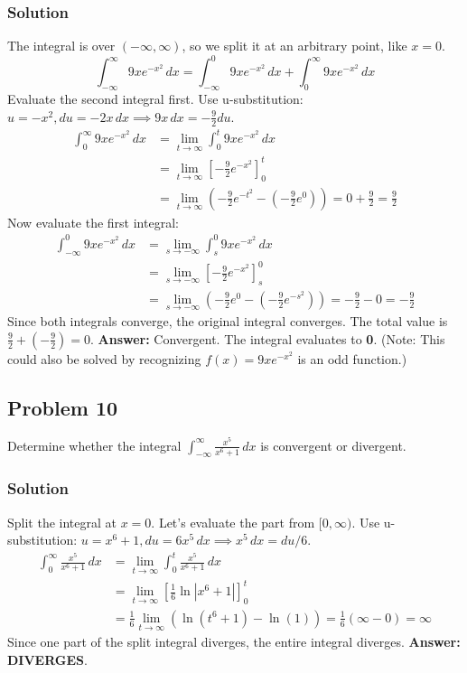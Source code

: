 \documentclass{article}
\begin{document}
\subsubsection*{Solution}
The integral is over $ (-\infty, \infty) $, so we split it at an arbitrary point, like $ x=0 $.
\[ \int_{-\infty}^{\infty} 9xe^{-x^2} \,dx = \int_{-\infty}^{0} 9xe^{-x^2} \,dx + \int_{0}^{\infty} 9xe^{-x^2} \,dx \]
Evaluate the second integral first. Use u-substitution: $ u = -x^2, du = -2x \,dx \implies 9x\,dx = -\frac{9}{2}du $.
\begin{align*}
    \int_{0}^{\infty} 9xe^{-x^2} \,dx &= \lim_{t \to \infty} \int_{0}^{t} 9xe^{-x^2} \,dx \\
    &= \lim_{t \to \infty} \left[ -\frac{9}{2}e^{-x^2} \right]_{0}^{t} \\
    &= \lim_{t \to \infty} \left( -\frac{9}{2}e^{-t^2} - \left(-\frac{9}{2}e^0\right) \right) = 0 + \frac{9}{2} = \frac{9}{2}
\end{align*}
Now evaluate the first integral:
\begin{align*}
    \int_{-\infty}^{0} 9xe^{-x^2} \,dx &= \lim_{s \to -\infty} \int_{s}^{0} 9xe^{-x^2} \,dx \\
    &= \lim_{s \to -\infty} \left[ -\frac{9}{2}e^{-x^2} \right]_{s}^{0} \\
    &= \lim_{s \to -\infty} \left( -\frac{9}{2}e^{0} - \left(-\frac{9}{2}e^{-s^2}\right) \right) = -\frac{9}{2} - 0 = -\frac{9}{2}
\end{align*}
Since both integrals converge, the original integral converges. The total value is $ \frac{9}{2} + (-\frac{9}{2}) = 0 $.
\textbf{Answer:} Convergent. The integral evaluates to \textbf{0}.
(Note: This could also be solved by recognizing $f(x)=9xe^{-x^2}$ is an odd function.)

\subsection{Problem 10}
Determine whether the integral $ \int_{-\infty}^{\infty} \frac{x^5}{x^6+1} \,dx $ is convergent or divergent.
\subsubsection*{Solution}
Split the integral at $ x=0 $. Let's evaluate the part from $ [0, \infty) $.
Use u-substitution: $ u = x^6+1, du = 6x^5 \,dx \implies x^5\,dx = du/6 $.
\begin{align*}
    \int_{0}^{\infty} \frac{x^5}{x^6+1} \,dx &= \lim_{t \to \infty} \int_{0}^{t} \frac{x^5}{x^6+1} \,dx \\
    &= \lim_{t \to \infty} \left[ \frac{1}{6}\ln|x^6+1| \right]_{0}^{t} \\
    &= \frac{1}{6} \lim_{t \to \infty} \left( \ln(t^6+1) - \ln(1) \right) = \frac{1}{6}(\infty - 0) = \infty
\end{align*}
Since one part of the split integral diverges, the entire integral diverges.
\textbf{Answer:} \textbf{DIVERGES}.
\end{document}
